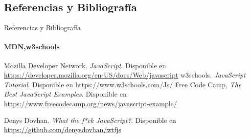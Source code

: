 \documentclass[aspectratio=169]{beamer}
\begin{document}
\begin{darkframes}
    \section*{Referencias y Bibliografía}
    \begin{frame}[label=bibliography]{Referencias y Bibliografía}
      \framesubtitle{MDN,w3schools}
      \begin{thebibliography}{9}
            Mozilla Developer Network.
            \emph{JavaScript}.
            Disponible en \url{https://developer.mozilla.org/en-US/docs/Web/javascript}
            w3schools.
            \emph{JavaScript Tutorial}.
            Disponible en \url{https://www.w3schools.com/Js/}
            Free Code Camp,
            \emph{The Best JavaScript Examples}.
            Disponible en \url{https://www.freecodecamp.org/news/javascript-example/}

            Denys Dovhan.
            \emph{What the f*ck JavaScript?}.
            Disponible en \url{https://github.com/denysdovhan/wtfjs}
      \end{thebibliography}
    \end{frame}
  \end{darkframes}
\end{document}
